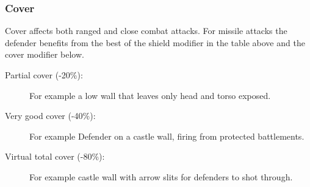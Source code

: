 \subsubsection{Cover}
Cover affects both ranged and close combat attacks. For missile attacks the defender benefits from the best of the shield modifier in the table above and the cover modifier below.

\begin{description}
	\item[Partial cover (-20\%):] For example a low wall that leaves only head and torso exposed.
	\item[Very good cover (-40\%):] For example Defender on a castle wall, firing from protected battlements.
	\item[Virtual total cover (-80\%):] For example castle wall with arrow slits for defenders to shot through.
\end{description}


